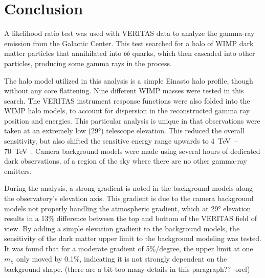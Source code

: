 \cleartooddpage[\thispagestyle{empty}]
\chapter{Conclusion}


A likelihood ratio test was used with VERITAS data to analyze the gamma-ray emission from the Galactic Center.
This test searched for a halo of WIMP dark matter particles that annihilated into $b\bar{b}$ quarks, which then cascaded into other particles, producing some gamma rays in the process.

The halo model utilized in this analysis is a simple Einasto halo profile, though without any core flattening.
Nine different WIMP masses were tested in this search.
The VERITAS instrument response functions were also folded into the WIMP halo models, to account for dispersion in the reconstructed gamma ray position and energies.
This particular analysis is unique in that observations were taken at an extremely low (\nicetilde{}\ang{29}) telescope elevation.
This reduced the overall sensitivity, but also shifted the sensitive energy range upwards to \SIrange{4}{70}{\TeV{}}.
Camera background models were made using several hours of dedicated dark observations, of a region of the sky where there are no other gamma-ray emitters.

During the analysis, a strong gradient is noted in the background models along the observatory's elevation axis.
This gradient is due to the camera background models not properly handling the atmospheric gradient, which at \ang{29} elevation results in a \nicetilde{}13\% difference between the top and bottom of the VERITAS field of view.
By adding a simple elevation gradient to the background models, the sensitivity of the dark matter upper limit to the background modeling was tested.
It was found that for a moderate gradient of 5\%/degree, the upper limit at one $m_{\chi}$ only moved by 0.1\%, indicating it is not strongly dependent on the background shape.
{\color{red}(there are a bit too many details in this paragraph?? -orel)}

